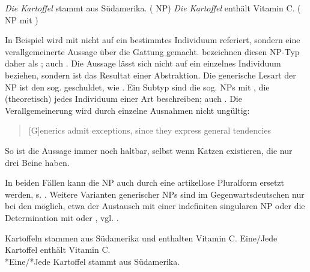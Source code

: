 \begin{exe}
	\ex \label{ex:gener}   
	\begin{xlist}
		\ex \label{ex:sued} \textit{Die Kartoffel} stammt aus Südamerika. ( NP)
		\ex \label{ex:vitc} \textit{Die Kartoffel} enthält Vitamin C. ( NP  mit )
		\end{xlist}
\end{exe}

In Beispiel  wird mit  nicht auf ein bestimmtes Individuum referiert, sondern eine verallgemeinerte Aussage über die Gattung  gemacht. \textcite[2]{Krifka1995} bezeichnen diesen NP-Typ daher als ; auch  \parencite[138]{Bisle-Muller1991}. Die Aussage lässt sich nicht auf ein einzelnes Individuum beziehen, sondern ist das Resultat einer Abstraktion. Die generische  Lesart der NP  ist den sog.  geschuldet, wie  \parencite{Krifka1995}. Ein Subtyp sind die sog.  NPs mit , die (theoretisch) jedes Individuum einer Art beschreiben; auch   \parencite[139--140]{Bisle-Muller1991}. Die Verallgemeinerung wird durch einzelne Ausnahmen nicht ungültig: \blockcquote[179]{Lyons1999}{[G]enerics admit exceptions, since they express general tendencies}. So ist die Aussage   immer noch haltbar, selbst wenn Katzen existieren, die nur drei Beine haben.

In beiden Fällen kann die NP  auch durch eine artikellose Pluralform  ersetzt werden, s. . 
Weitere Varianten generischer  NPs  sind im Gegenwartsdeutschen nur bei den  möglich, etwa der Austausch mit einer indefiniten  singularen NP  oder die Determination mit  oder  \parencite[296]{Duden2009}, vgl. . 

\begin{exe}
	\ex \label{ex:gener3}   
	\begin{xlist}
		\ex \label{ex:sued2} Kartoffeln stammen aus Südamerika und enthalten Vitamin C. 
		\ex \label{ex:vitc2}  Eine/Jede Kartoffel enthält Vitamin C.\\
		*Eine/*Jede Kartoffel stammt aus Südamerika.
		\end{xlist}
\end{exe}

